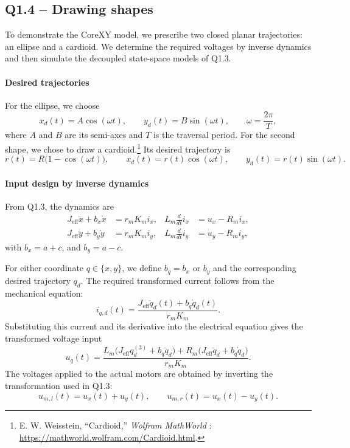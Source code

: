 \documentclass[a4paper,12pt]{article}
\begin{document}
\subsection*{Q1.4 -- Drawing shapes}

To demonstrate the CoreXY model, we prescribe two closed planar trajectories: an ellipse and a cardioid. We determine the required voltages by inverse dynamics and then simulate the decoupled state-space models of Q1.3.

\paragraph{Desired trajectories}
For the ellipse, we choose
\begin{equation}
 x_d(t)=A\cos(\omega t),\qquad
 y_d(t)=B\sin(\omega t),\qquad \omega=\frac{2\pi}{T},
\end{equation}
where $A$ and $B$ are its semi-axes and $T$ is the traversal period. For the second shape, we chose to draw a cardioid.\footnote{E. W. Weisstein, ``Cardioid,'' \textit{Wolfram MathWorld} : \url{https://mathworld.wolfram.com/Cardioid.html}.}
Its desired trajectory is
\begin{equation}
 r(t)=R\bigl(1-\cos(\omega t)\bigr),\qquad
 x_d(t)=r(t)\cos(\omega t),\qquad
 y_d(t)=r(t)\sin(\omega t).
\end{equation}


\paragraph{Input design by inverse dynamics}
From Q1.3, the dynamics are
\begin{equation}
\begin{aligned}
J_{\mathrm{eff}}\ddot x+b_x\dot x&=r_mK_m i_x,
& L_m\frac{d}{dt} i_x&=u_x-R_m i_x,\\
J_{\mathrm{eff}}\ddot y+b_y\dot y&=r_mK_m i_y,
& L_m\frac{d}{dt} i_y&=u_y-R_m i_y,
\end{aligned}
\end{equation}
with $b_x=a+c$, and $b_y=a-c$. 

For either coordinate $q\in\{x,y\}$, we define $b_q=b_x$ or $b_y$ and the corresponding desired trajectory $q_d$. The required transformed current follows from the mechanical equation:
\begin{equation}
 i_{q,d}(t)=\frac{J_{\mathrm{eff}}\ddot q_d(t)+b_q\dot q_d(t)}{r_mK_m}.
\end{equation}
Substituting this current and its derivative into the electrical equation gives the transformed voltage input
\begin{equation}
\boxed{
 u_q(t)=\frac{L_m\bigl(J_{\mathrm{eff}}q_d^{(3)}+b_q\ddot q_d\bigr)
 +R_m\bigl(J_{\mathrm{eff}}\ddot q_d+b_q\dot q_d\bigr)}{r_mK_m}}.
\end{equation}
The voltages applied to the actual motors are obtained by inverting the transformation used in Q1.3:
\begin{equation}
\boxed{u_{m,l}(t)=u_x(t)+u_y(t),\qquad
u_{m,r}(t)=u_x(t)-u_y(t).}
\end{equation}
\end{document}
